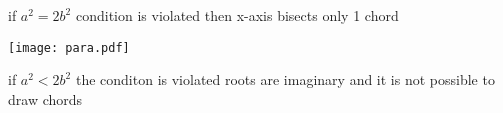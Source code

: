 \documentclass[10pt, a4paper]{article}
\begin{document}
if $a^2=2b^2$  condition is violated then x-axis bisects only 1 chord


\texttt{[image: para.pdf]}



if $a^2<2b^2$  the conditon is violated roots are imaginary and it is not possible to draw chords 
\end{document}
